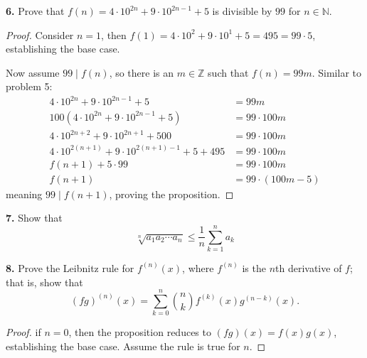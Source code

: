 \documentclass[12pt]{amsart}
\newenvironment{statement}[1]{\smallskip\noindent\color[rgb]{1.00,0.00,0.50} {\bf #1.}}{}
\theoremstyle{definition}
\theoremstyle{remark}
\newcommand{\BZ}{\mathbb Z}
\newcommand{\BN}{\mathbb N}
\begin{document}
\begin{statement}{6}
Prove that $f(n) = 4\cdot 10^{2n} + 9\cdot 10^{2n-1} + 5$ is divisible
by $99$ for $n \in \BN$.
\end{statement}
\begin{proof}
  Consider $n=1$, then $f(1) = 4\cdot 10^2 + 9\cdot 10^1 + 5 = 495 =
  99\cdot 5$, establishing the base case.

  Now assume $99 \mid f(n)$, so there is an $m \in \BZ$ such that $f(n) = 99m$. Similar to problem 5:
  \begin{align*}
    4\cdot 10^{2n} + 9\cdot 10^{2n-1} + 5 &= 99m \\
    100(4\cdot 10^{2n} + 9\cdot 10^{2n-1} + 5) &= 99\cdot 100m \\
    4\cdot 10^{2n + 2} + 9\cdot 10^{2n +1} + 500 &= 99\cdot 100m \\
    4\cdot 10^{2(n + 1)} + 9\cdot 10^{2(n+1) - 1} + 5+ 495 &= 99\cdot 100m \\
    f(n+1) + 5\cdot99 &= 99\cdot 100m \\
    f(n+1) &= 99\cdot(100m -5)
  \end{align*}
  meaning $99 \mid f(n+1)$, proving the proposition.
\end{proof}

\begin{statement}{7}
  Show that
  \begin{equation*}
    \sqrt[n]{a_1 a_2 \cdots a_n} \le \frac{1}{n} \sum_{k=1}^n a_k
    \end{equation*}
\end{statement}

\begin{statement}{8}
  Prove the Leibnitz rule for $f^{(n)}(x)$, where $f^{(n)}$ is the $n$th derivative of $f$; that is, show that
  \begin{equation*}
    (fg)^{(n)}(x) = \sum_{k=0}^n \binom{n}{k} f^{(k)}(x) g^{(n-k)}(x).
    \end{equation*}
\end{statement}
\begin{proof}
  if $n=0$, then the proposition reduces to $(fg)(x) = f(x)g(x)$,
  establishing the base case. Assume the rule is true for $n$.

  
\end{proof}
\end{document}
